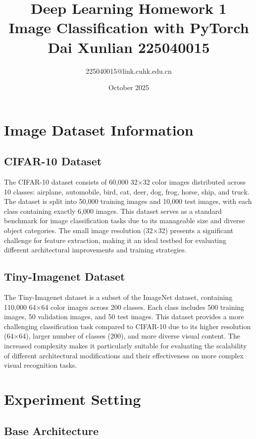 \documentclass{article}
\title{Deep Learning Homework 1 \\ Image Classification with PyTorch \\ Dai Xunlian 225040015}
\author{225040015@link.cuhk.edu.cn}
\date{October 2025}
\begin{document}
\maketitle

\section{Image Dataset Information}

\subsection{CIFAR-10 Dataset}

The CIFAR-10 dataset consists of 60,000 32×32 color images distributed across 10 classes: airplane, automobile, bird, cat, deer, dog, frog, horse, ship, and truck. The dataset is split into 50,000 training images and 10,000 test images, with each class containing exactly 6,000 images. This dataset serves as a standard benchmark for image classification tasks due to its manageable size and diverse object categories. The small image resolution (32×32) presents a significant challenge for feature extraction, making it an ideal testbed for evaluating different architectural improvements and training strategies.

\subsection{Tiny-Imagenet Dataset}

The Tiny-Imagenet dataset is a subset of the ImageNet dataset, containing 110,000 64×64 color images across 200 classes. Each class includes 500 training images, 50 validation images, and 50 test images. This dataset provides a more challenging classification task compared to CIFAR-10 due to its higher resolution (64×64), larger number of classes (200), and more diverse visual content. The increased complexity makes it particularly suitable for evaluating the scalability of different architectural modifications and their effectiveness on more complex visual recognition tasks.

\section{Experiment Setting}

\subsection{Base Architecture}
\end{document}
